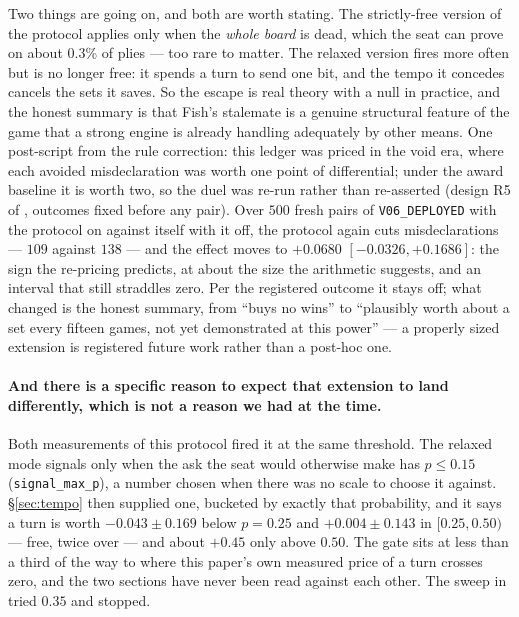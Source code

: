 \documentclass[11pt,a4paper]{article}
\begin{document}
Two things are going on, and both are worth stating. The strictly-free version
of the protocol applies only when the \emph{whole board} is dead, which the seat
can prove on about 0.3\% of plies --- too rare to matter. The relaxed version
fires more often but is no longer free: it spends a turn to send one bit, and
the tempo it concedes cancels the sets it saves. So the escape is real theory
with a null in practice, and the honest summary is that Fish's stalemate is a
genuine structural feature of the game that a strong engine is already handling
adequately by other means. One post-script from the rule correction: this
ledger was priced in the void era, where each avoided misdeclaration was
worth one point of differential; under the award baseline it is worth two,
so the duel was re-run rather than re-asserted (design R5 of
, outcomes fixed before any pair).
Over $500$ fresh pairs of \texttt{V06\_DEPLOYED} with the protocol on
against itself with it off, the protocol again cuts misdeclarations ---
$109$ against $138$ --- and the effect moves to $+0.0680$
$[-0.0326, +0.1686]$: the sign the re-pricing predicts, at about the size
the arithmetic suggests, and an interval that still straddles zero. Per
the registered outcome it stays off; what changed is the honest summary,
from ``buys no wins'' to ``plausibly worth about a set every fifteen
games, not yet demonstrated at this power'' --- a properly sized
extension is registered future work rather than a post-hoc one.

\paragraph{And there is a specific reason to expect that extension to land
differently, which is not a reason we had at the time.} Both measurements of
this protocol fired it at the same threshold. The relaxed mode signals only
when the ask the seat would otherwise make has $p \leq 0.15$
(\texttt{signal\_max\_p}), a number chosen when there was no scale to choose it
against. \S\ref{sec:tempo} then supplied one, bucketed by exactly that
probability, and it says a turn is worth $-0.043 \pm 0.169$ below $p = 0.25$
and $+0.004 \pm 0.143$ in $[0.25, 0.50)$ --- free, twice over --- and about
$+0.45$ only above $0.50$. The gate sits at less than a third of the way to
where this paper's own measured price of a turn crosses zero, and the two
sections have never been read against each other. The sweep in
 tried $0.35$ and stopped.
\end{document}
